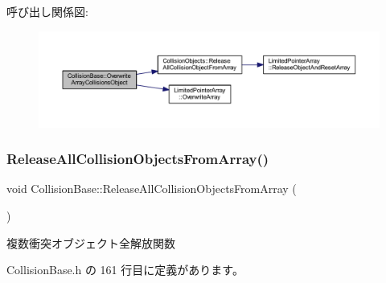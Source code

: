 呼び出し関係図\+:\nopagebreak
\begin{figure}[H]
\begin{center}
\leavevmode
\includegraphics[width=350pt]{class_collision_base_a4a7bba0fc9d39e27dc58d695f04cf186_cgraph}
\end{center}
\end{figure}
\mbox{\label{class_collision_base_a54d52219e2bf43ed2a9b2a11813934ea}} 
\subsubsection{\texorpdfstring{Release\+All\+Collision\+Objects\+From\+Array()}{ReleaseAllCollisionObjectsFromArray()}}
{\footnotesize\ttfamily void Collision\+Base\+::\+Release\+All\+Collision\+Objects\+From\+Array (\begin{DoxyParamCaption}{ }\end{DoxyParamCaption})\hspace{0.3cm}{\ttfamily [inline]}}



複数衝突オブジェクト全解放関数 



 Collision\+Base.\+h の 161 行目に定義があります。

